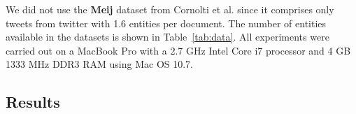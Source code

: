 We did not use the \textbf{Meij} dataset from Cornolti et al. since it comprises only tweets from twitter with 1.6 entities per document. The number of entities available in the datasets is shown in Table~\ref{tab:data}.
All experiments were carried out on a MacBook Pro with a 2.7 GHz Intel Core i7 processor and 4 GB 1333 MHz DDR3 RAM using Mac OS 10.7. 


\begin{table}[tb!]
\centering
\caption{Test corpora specification including the number of documents (\#Doc.) and the number of named entities (\#Ent.) per dataset}
\label{tab:data}
\end{table}



\subsection{Results}
\label{results}

